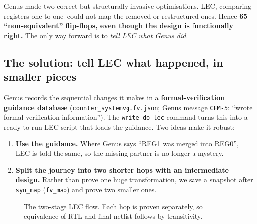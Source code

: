 \documentclass[11pt]{article}
\newcommand{\code}[1]{\texttt{\small #1}}
\begin{document}
\begin{probbox}
Genus made two correct but structurally invasive optimisations. LEC, comparing registers one-to-one,
could not map the removed or restructured ones. Hence \textbf{65 ``non-equivalent'' flip-flops, even though the design is functionally right.}
The only way forward is to \emph{tell LEC what Genus did}.
\end{probbox}

\subsection{The solution: tell LEC what happened, in smaller pieces}

Genus records the sequential changes it makes in a \textbf{formal-verification guidance database}
(\code{counter\_systemvg.fv.json}; Genus message \code{CFM-5}: ``wrote formal verification information''). The \code{write\_do\_lec} command turns this into
a ready-to-run LEC script that loads the guidance. Two ideas make it robust:

\begin{enumerate}
  \item \textbf{Use the guidance.} Where Genus says ``REG1 was merged into REG0'', LEC is told the same, so the missing partner is no longer a mystery.
  \item \textbf{Split the journey into two shorter hops with an intermediate design.}
        Rather than prove one huge transformation, we save a snapshot after \code{syn\_map} (\code{fv\_map}) and prove two smaller ones.
\end{enumerate}

\begin{figure}[H]
\centering
{}
\caption{The two-stage LEC flow. Each hop is proven separately, so equivalence of RTL and final netlist follows by transitivity.}
\label{fig:twostage}
\end{figure}
\end{document}
